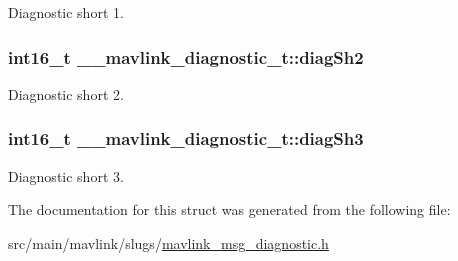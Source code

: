 Diagnostic short 1. 

\hypertarget{struct____mavlink__diagnostic__t_abf3bfeb2dc62ae1779079d22ef545a96}{
\subsubsection[{diag\+Sh2}]{\setlength{\rightskip}{0pt plus 5cm}int16\+\_\+t \+\_\+\+\_\+mavlink\+\_\+diagnostic\+\_\+t\+::diag\+Sh2}}\label{struct____mavlink__diagnostic__t_abf3bfeb2dc62ae1779079d22ef545a96}


Diagnostic short 2. 

\hypertarget{struct____mavlink__diagnostic__t_a74832766a045beaace2517e27b45f6a2}{
\subsubsection[{diag\+Sh3}]{\setlength{\rightskip}{0pt plus 5cm}int16\+\_\+t \+\_\+\+\_\+mavlink\+\_\+diagnostic\+\_\+t\+::diag\+Sh3}}\label{struct____mavlink__diagnostic__t_a74832766a045beaace2517e27b45f6a2}


Diagnostic short 3. 



The documentation for this struct was generated from the following file\+:\begin{DoxyCompactItemize}
\item 
src/main/mavlink/slugs/\hyperlink{mavlink__msg__diagnostic_8h}{mavlink\+\_\+msg\+\_\+diagnostic.\+h}\end{DoxyCompactItemize}
